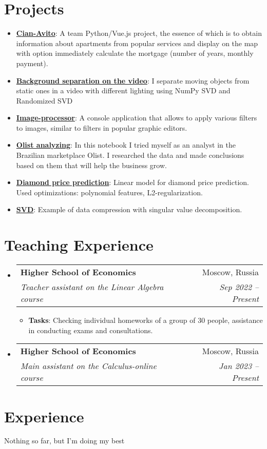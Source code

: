 \documentclass{resume}
\makeatletter
\newcommand{\resumeItem}[2]{
  \item\small{
    \textbf{#1}{: #2 \vspace{-2pt}}
  }
}
\newcommand{\resumeSubheading}[4]{
  \vspace{-1pt}\item
    \begin{tabular*}{0.97\textwidth}[t]{l@{\extracolsep{\fill}}r}
      \textbf{#1} & #2 \\
      \textit{\small#3} & \textit{\small #4} \\
    \end{tabular*}\vspace{-5pt}
}
\newcommand{\resumeSubItem}[2]{\resumeItem{#1}{#2}\vspace{-4pt}}
\newcommand{\resumeSubHeadingListStart}{\begin{itemize}[leftmargin=*]}
\newcommand{\resumeSubHeadingListEnd}{\end{itemize}}
\newcommand{\resumeItemListStart}{\begin{itemize}}
\newcommand{\resumeItemListEnd}{\end{itemize}\vspace{-5pt}}
\makeatother
\begin{document}
\section{Projects}
  \resumeSubHeadingListStart
    \resumeSubItem{\href{https://github.com/free001style/Cian_Avito_project}{Cian-Avito}}
      {A team Python/Vue.js project, the essence of which is to obtain information about apartments from popular services and display on the map with option immediately calculate the mortgage (number of years, monthly payment).}
      \bigskip
    \resumeSubItem{\href{https://github.com/free001style/Foundation-of-matrix-computation/blob/master/PDZ-1.ipynb}{Background separation on the video}}
    {I separate moving objects from static ones in a video with different lighting using NumPy SVD and Randomized SVD}
    \bigskip
    \resumeSubItem{\href{https://github.com/free001style/image_processor}{Image-processor}}
      {A console application that allows to apply various filters to images, similar to filters in popular graphic editors.}
      \bigskip
     \resumeSubItem{\href{https://github.com/free001style/Deep_Python-HSE/blob/main/HW-1_data_analysis/Drobyshevskiy_Ilya_HW_1_data_analysis.ipynb}{Olist analyzing}}
      {In this notebook I tried myself as an analyst in the Brazilian marketplace Olist. I researched the data and made conclusions based on them that will help the business grow.}
      \bigskip
    \resumeSubItem{\href{https://github.com/free001style/LinearAlgebra-HSE/blob/main/homework-practice-02-linregr-Drobyshevskiy.ipynb}{Diamond price prediction}}
      {Linear model for diamond price prediction. Used optimizations: polynomial features, L2-regularization.}
      \bigskip
    \resumeSubItem{\href{https://github.com/free001style/LinearAlgebra-HSE/blob/main/homework_practice_03_linregr.ipynb}{SVD}}
      {Example of data compression with singular value decomposition.}
    
  \resumeSubHeadingListEnd


\section{Teaching Experience}
\resumeSubHeadingListStart
    \resumeSubheading
      {Higher School of Economics}{Moscow, Russia}
      {Teacher assistant on the Linear Algebra course}{Sep 2022 -- Present}
      \resumeItemListStart
      \medskip
      \resumeItem{Tasks} {Checking individual homeworks of a group of 30 people, assistance in conducting exams and consultations.}
      \resumeItemListEnd
      \medskip
    \resumeSubheading
      {Higher School of Economics}{Moscow, Russia}
      {Main assistant on the Calculus-online course}{Jan 2023 -- Present}
  \resumeSubHeadingListEnd




\section{Experience}
Nothing so far, but I'm doing my best
\end{document}

